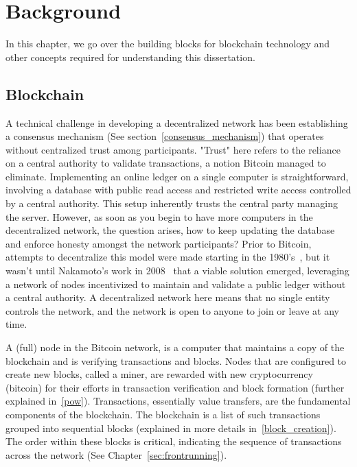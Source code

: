 


\chapter{Background} \label{sec:background}

In this chapter, we go over the building blocks for blockchain technology and other concepts required for understanding this dissertation.

\section{Blockchain}
A technical challenge in developing a decentralized network has been establishing a consensus mechanism (See section~\ref{consensus_mechanism}) that operates without centralized trust among participants. "Trust" here refers to the reliance on a central authority to validate transactions, a notion Bitcoin managed to eliminate. Implementing an online ledger on a single computer is straightforward, involving a database with public read access and restricted write access controlled by a central authority. This setup inherently trusts the central party managing the server. However, as soon as you begin to have more computers in the decentralized network, the question arises, how to keep updating the database and enforce honesty amongst the network participants? Prior to Bitcoin, attempts to decentralize this model were made starting in the 1980's~\cite{narayanan2017bitcoin}, but it wasn't until Nakamoto's work in 2008~\cite{nakamoto2008bitcoin} that a viable solution emerged, leveraging a network of nodes incentivized to maintain and validate a public ledger without a central authority. A decentralized network here means that no single entity controls the network, and the network is open to anyone to join or leave at any time.

A (full) node in the Bitcoin network, is a computer that maintains a copy of the blockchain and is verifying transactions and blocks. Nodes that are configured to create new blocks, called a miner, are rewarded with new cryptocurrency (bitcoin) for their efforts in transaction verification and block formation (further explained in~\ref{pow}). Transactions, essentially value transfers, are the fundamental components of the blockchain. The blockchain is a list of such transactions grouped into sequential blocks (explained in more details in~\ref{block_creation}). The order within these blocks is critical, indicating the sequence of transactions across the network (See Chapter~\ref{sec:frontrunning}). 


